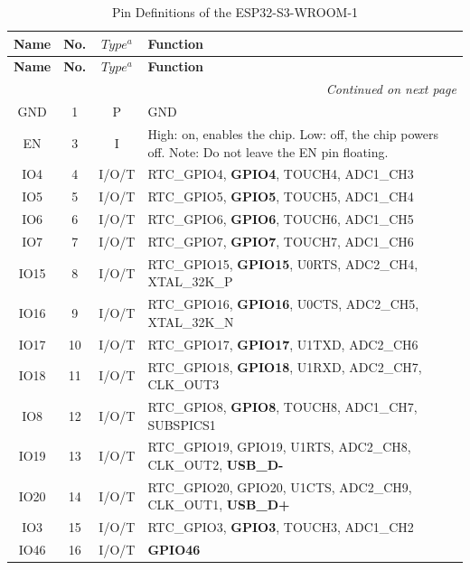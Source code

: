 \begin{longtable}[H]{|c|c|c|p{7cm}|}
	\caption[Pin Definitions of the ESP32-S3-WROOM-1]{Pin Definitions of the ESP32-S3-WROOM-1 \cite[see][3]{Espressif:2024}}
	\label{PinESP} \\
	\hline
	\textbf{Name} & \textbf{No.} & \textbf{$Type^a$} & \textbf{Function} \\
	\hline
	\endfirsthead
	
	\hline
	\textbf{Name} & \textbf{No.} & \textbf{$Type^a$} & \textbf{Function} \\
	\hline
	\endhead
	
	\hline
	\multicolumn{4}{r}{\textit{Continued on next page}} \\
	\endfoot
	
	\hline
	\endlastfoot
	
	GND & 1 & P & GND \\
	\hline
	EN & 3 & I & High: on, enables the chip. Low: off, the chip powers off. Note: Do not leave the EN pin floating. \\
	\hline
	IO4 & 4 & I/O/T & RTC\_GPIO4, \textbf{GPIO4}, TOUCH4, ADC1\_CH3 \\
	\hline
	IO5 & 5 & I/O/T & RTC\_GPIO5, \textbf{GPIO5}, TOUCH5, ADC1\_CH4 \\
	\hline
	IO6 & 6 & I/O/T & RTC\_GPIO6, \textbf{GPIO6}, TOUCH6, ADC1\_CH5 \\
	\hline
	IO7 & 7 & I/O/T & RTC\_GPIO7, \textbf{GPIO7}, TOUCH7, ADC1\_CH6 \\
	\hline
	IO15 & 8 & I/O/T & RTC\_GPIO15, \textbf{GPIO15}, U0RTS, ADC2\_CH4, XTAL\_32K\_P \\
	\hline
	IO16 & 9 & I/O/T & RTC\_GPIO16, \textbf{GPIO16}, U0CTS, ADC2\_CH5, XTAL\_32K\_N \\
	\hline
	IO17 & 10 & I/O/T & RTC\_GPIO17, \textbf{GPIO17}, U1TXD, ADC2\_CH6 \\
	\hline
	IO18 & 11 & I/O/T & RTC\_GPIO18, \textbf{GPIO18}, U1RXD, ADC2\_CH7, CLK\_OUT3 \\
	\hline
	IO8 & 12 & I/O/T & RTC\_GPIO8, \textbf{GPIO8}, TOUCH8, ADC1\_CH7, SUBSPICS1 \\
	\hline
	IO19 & 13 & I/O/T & RTC\_GPIO19, GPIO19, U1RTS, ADC2\_CH8, CLK\_OUT2, \textbf{USB\_D-} \\
	\hline
	IO20 & 14 & I/O/T & RTC\_GPIO20, GPIO20, U1CTS, ADC2\_CH9, CLK\_OUT1, \textbf{USB\_D+} \\
	\hline
	IO3 & 15 & I/O/T & RTC\_GPIO3, \textbf{GPIO3}, TOUCH3, ADC1\_CH2 \\
	\hline
	IO46 & 16 & I/O/T & \textbf{GPIO46} \\

\end{longtable}
